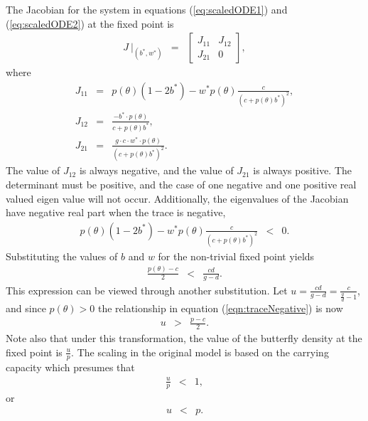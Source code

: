 \documentclass[review]{elsarticle}
\begin{document}
The Jacobian for the system in equations (\ref{eq:scaledODE1}) and
(\ref{eq:scaledODE2}) at the fixed point is
\begin{eqnarray}
  J ~ \bigg|_{(b^*,w^*)} & = &
          \left[
          \begin{array}{rr}
            J_{11} & J_{12} \\
            J_{21} & 0
          \end{array}
          \right],
\end{eqnarray}
where
\begin{eqnarray}
  \label{eq:jacobian}
  J_{11} & = & p(\theta)(1-2b^*) - w^* p(\theta)\frac{c}{(c+p(\theta)b^*)^2}, \\
  J_{12} & = & \frac{-b^*\cdot p(\theta)}{c+p(\theta)b^*}, \\
  J_{21} & = & \frac{g\cdot c \cdot w^* \cdot p(\theta)}{(c+p(\theta)b^*)^2}.
\end{eqnarray}
The value of $J_{12}$ is always negative, and the value of $J_{21}$ is always positive. The determinant must be positive, and the case of one negative and one positive real valued eigen value will not occur.
Additionally, the eigenvalues of the Jacobian have negative real part when the
trace is negative,
\begin{eqnarray}
  p(\theta)(1-2b^*) - w^* p(\theta)\frac{c}{(c+p(\theta)b^*)^2} & < & 0.
\end{eqnarray}
Substituting the values of $b$ and $w$ for the non-trivial fixed point
yields
\begin{eqnarray}
  \label{eqn:traceNegative}
  \frac{p(\theta)-c}{2} & < & \frac{cd}{g-d}.
\end{eqnarray}
This expression can be viewed through another substitution. Let
$u=\frac{cd}{g-d}=\frac{c}{\frac{g}{d}-1}$, and since
$p(\theta)>0$ the relationship in equation
(\ref{eqn:traceNegative}) is now
\begin{eqnarray}
  \label{eq:stabilityParameters}
  u & > & \frac{p-c}{2}.
\end{eqnarray}
Note also that under this transformation, the value of the butterfly
density at the fixed point is $\frac{u}{p}$. The scaling in the
original model is based on the carrying capacity which presumes that
\begin{eqnarray}
  \frac{u}{p} & < & 1,
\end{eqnarray}
or 
\begin{eqnarray}
  \label{eq:boundFixedPoint}
  u & < & p.
\end{eqnarray}
\end{document}
